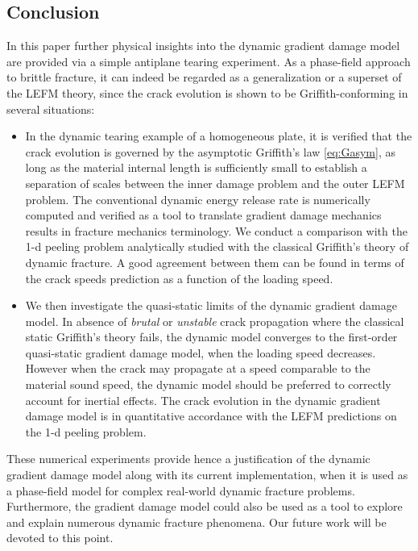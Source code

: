 \subsection{Conclusion}
In this paper further physical insights into the dynamic gradient damage model are provided via a simple antiplane tearing experiment. As a phase-field approach to brittle fracture, it can indeed be regarded as a generalization or a superset of the LEFM theory, since the crack evolution is shown to be Griffith-conforming in several situations:
\begin{itemize}
\item In the dynamic tearing example of a homogeneous plate, it is verified that the crack evolution is governed by the asymptotic Griffith's law \eqref{eq:Gasym}, as long as the material internal length is sufficiently small to establish a separation of scales between the inner damage problem and the outer LEFM problem. The conventional dynamic energy release rate is numerically computed and verified as a tool to translate gradient damage mechanics results in fracture mechanics terminology. We conduct a comparison with the 1-d peeling problem \cite{DumouchelMarigoCharlotte:2008} analytically studied with the classical Griffith's theory of dynamic fracture. A good agreement between them can be found in terms of the crack speeds prediction as a function of the loading speed.

\item We then investigate the quasi-static limits of the dynamic gradient damage model. In absence of \emph{brutal} or \emph{unstable} crack propagation where the classical static Griffith's theory fails, the dynamic model converges to the first-order quasi-static gradient damage model, when the loading speed decreases. However when the crack may propagate at a speed comparable to the material sound speed, the dynamic model should be preferred to correctly account for inertial effects. The crack evolution in the dynamic gradient damage model is in quantitative accordance with the LEFM predictions on the 1-d peeling problem.
\end{itemize}

These numerical experiments provide hence a justification of the dynamic gradient damage model along with its current implementation, when it is used as a phase-field model for complex real-world dynamic fracture problems. Furthermore, the gradient damage model could also be used as a tool to explore and explain numerous dynamic fracture phenomena. Our future work will be devoted to this point.

